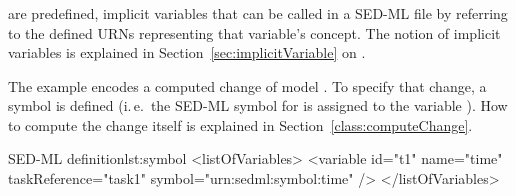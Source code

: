 \subsubsection{}
\label{sec:symbol}

 are predefined, implicit variables that can be called in a SED-ML file by referring to the defined URNs representing that variable's concept. The notion of implicit variables is explained in Section~\ref{sec:implicitVariable} on .

The example encodes a computed change of model . To specify that change, a symbol is defined (i.\,e.\  the SED-ML symbol for  is assigned to the variable ). How to compute the change itself is explained in Section~\ref{class:computeChange}.
%
\begin{myXmlLst}{SED-ML  definition}{lst:symbol}
   <listOfVariables>
    <variable id="t1" name="time" taskReference="task1" 
    symbol="urn:sedml:symbol:time" />
   </listOfVariables>
\end{myXmlLst}


